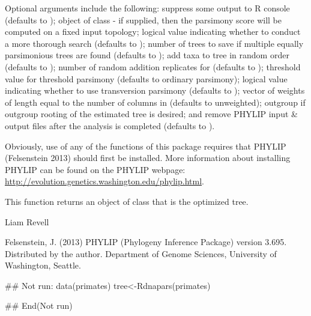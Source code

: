 \documentclass[a4paper]{book}
\begin{document}
\begin{Details}\relax
Optional arguments include the following:  suppress some output to R console (defaults to );  object of class  - if supplied, then the parsimony score will be computed on a fixed input topology;  logical value indicating whether to conduct a more thorough search (defaults to );  number of trees to save if multiple equally parsimonious trees are found (defaults to );  add taxa to tree in random order (defaults to );  number of random addition replicates for  (defaults to );  threshold value for threshold parsimony (defaults to ordinary parsimony);  logical value indicating whether to use transversion parsimony (defaults to );  vector of weights of length equal to the number of columns in  (defaults to unweighted);  outgroup if outgroup rooting of the estimated tree is desired; and  remove PHYLIP input \& output files after the analysis is completed (defaults to ).

Obviously, use of any of the functions of this package requires that PHYLIP (Felsenstein 2013) should first be installed. More information about installing PHYLIP can be found on the PHYLIP webpage: \url{http://evolution.genetics.washington.edu/phylip.html}.
\end{Details}
%
\begin{Value}
This function returns an object of class  that is the optimized tree.
\end{Value}
%
\begin{Author}\relax
Liam Revell 
\end{Author}
%
\begin{References}\relax
Felsenstein, J. (2013) PHYLIP (Phylogeny Inference Package) version 3.695. Distributed by the author. Department of Genome Sciences, University of Washington, Seattle.
\end{References}
%
\begin{SeeAlso}\relax
{}
\end{SeeAlso}
%
\begin{Examples}
\begin{ExampleCode}
## Not run: 
data(primates)
tree<-Rdnapars(primates)

## End(Not run)
\end{ExampleCode}
\end{Examples}
\end{document}
